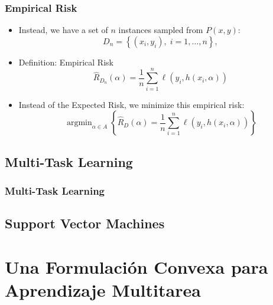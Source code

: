 \documentclass[aspectratio=43]{beamer}
\DeclareMathOperator*{\argmin}{arg\min}
\newcommand{\set}[1]{\left\{#1\right\}}
\newcommand{\hypf}{h}
\newcommand{\hyp}[2]{\hypf\left(#1, #2\right)}
\newcommand{\nsamples}{n}
\newcommand{\param}{\alpha}
\newcommand{\paramspace}{A}
\newcommand{\distf}{P}
\newcommand{\sample}{D}
\newcommand{\samplen}{D_{\nsamples}}
\newcommand{\risk}{R}
\newcommand{\emprisk}{\hat{\risk}_{\sample}}
\newcommand{\empriskn}{\hat{\risk}_{\samplen}}
\begin{document}
\begin{frame}
      \frametitle{Empirical Risk}

      \begin{itemize}
            \item Instead, we have a set of $\nsamples$ instances sampled from $\distf(x,y)$:
            \begin{equation}
                  \nonumber
                  \samplen = \set{(x_i, y_i), \; i=1, \ldots, \nsamples} ,
              \end{equation}
            \item Definition: Empirical Risk
            $$ \empriskn(\param) = \frac{1}{\nsamples} \sum_{i=1}^\nsamples \ell(y_i, \hyp{x_i}{\param}) $$
            \item Instead of the Expected Risk, we minimize this empirical risk:
            \begin{equation}
                  \nonumber
                  \argmin_{\param \in \paramspace} \left\{ \emprisk(\param) = \frac{1}{\nsamples} \sum_{i=1}^\nsamples \ell(y_i, \hyp{x_i}{\param}) \right\}
              \end{equation}
      \end{itemize}

\end{frame}



\subsection{Multi-Task Learning}

\begin{frame}
      \frametitle{Multi-Task Learning}

      

\end{frame}

\subsection{Support Vector Machines}

\section{Una Formulación Convexa para Aprendizaje Multitarea}
\end{document}
